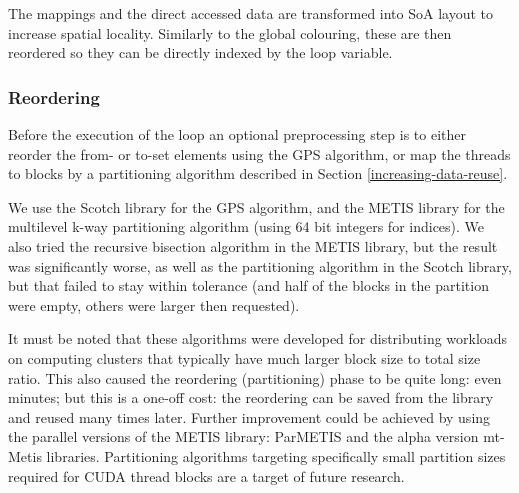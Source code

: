 The mappings and the direct accessed data are transformed into SoA layout to
increase spatial locality. Similarly to the global colouring, these are then
reordered so they can be directly indexed by the loop variable.

\subsubsection{Reordering}

Before the execution of the loop an optional preprocessing step is to either
reorder the from- or to-set elements using the GPS algorithm, or map the threads
to blocks by a partitioning algorithm described in Section
\ref{increasing-data-reuse}.

We use the Scotch library\cite{scotch} for the GPS algorithm, and the
METIS\cite{metis} library for the multilevel k-way partitioning algorithm (using
64 bit integers for indices). We also tried the recursive bisection algorithm in
the METIS library, but the result was significantly worse, as well as the
partitioning algorithm in the Scotch library, but that failed to stay within
tolerance (and half of the blocks in the partition were empty, others were
larger then requested).

It must be noted that these algorithms were developed for distributing workloads
on computing clusters that typically have much larger block size to total size
ratio. This also caused the reordering (partitioning) phase to be quite long:
even minutes; but this is a one-off cost: the reordering can be saved from the
library and reused many times later. Further improvement could be achieved by
using the parallel versions of the METIS library: ParMETIS\cite{parmetis} and
the alpha version mt-Metis\cite{mtmetis} libraries. Partitioning algorithms
targeting specifically small partition sizes required for CUDA thread blocks are
a target of future research.

